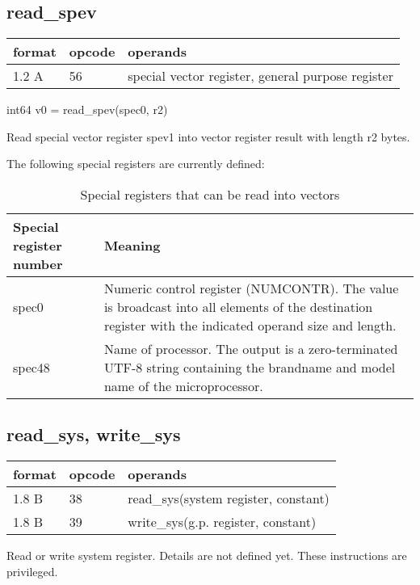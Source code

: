 \documentclass[forwardcom.tex]{subfiles}
\begin{document}
\vv


\subsection{read\_spev}
\label{table:readSpevInstruction}
\begin{tabular}{|p{12mm}|p{15mm}|p{100mm}|}
\hline
\bfseries format & \bfseries opcode & \bfseries operands \\ \hline
1.2 A & 56 & special vector register, general purpose register \\ \hline
\end{tabular}
\vv

int64 v0 = read\_spev(spec0, r2)
\vv

Read special vector register spev1 into vector register result with length r2 bytes.
\vv

The following special registers are currently defined:

\begin{longtable} {|p{15mm}|p{100mm}|}
\caption{Special registers that can be read into vectors} 
\label{table:specialVectorRegisters} \\
\endfirsthead
\endhead
\hline
\bfseries Special register number & \bfseries Meaning  \\
\hline
spec0 & Numeric control register (NUMCONTR). The value is broadcast into all elements of the destination register with the indicated operand size and length.  \\
\hline
spec48 & Name of processor. The output is a zero-terminated UTF-8 string containing the brandname and model name of the microprocessor. \\
\hline
\end{longtable}
\vv

\subsection{read\_sys, write\_sys}
\label{table:readSysInstruction}
\begin{tabular}{|p{12mm}|p{15mm}|p{100mm}|}
\hline
\bfseries format & \bfseries opcode & \bfseries operands \\ \hline
1.8 B & 38 & read\_sys(system register, constant) \\ \hline
1.8 B & 39 & write\_sys(g.p. register, constant) \\ \hline
\end{tabular}
\vv

Read or write system register. Details are not defined yet. These instructions are privileged.
\end{document}
